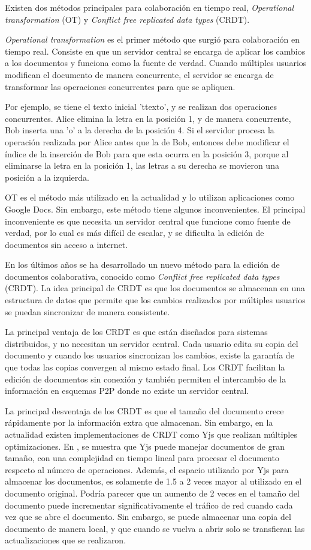 \documentclass[a4paper, oneside, final]{scrartcl}
\begin{document}
Existen dos métodos principales para colaboración en tiempo real, \textit{Operational transformation} (OT) y \textit{Conflict free replicated data types} (CRDT).

\textit{Operational transformation} es el primer método que surgió para colaboración en tiempo real. Consiste en que un servidor central se encarga de aplicar los cambios a los documentos y funciona como la fuente de verdad. Cuando múltiples usuarios modifican el documento de manera concurrente, el servidor se encarga de transformar las operaciones concurrentes para que se apliquen. 

Por ejemplo, se tiene el texto inicial 'ttexto', y se realizan dos operaciones concurrentes. Alice elimina la letra en la posición 1, y de manera concurrente, Bob inserta una 'o' a la derecha de la posición 4. Si el servidor procesa la operación realizada por Alice antes que la de Bob, entonces debe modificar el índice de la inserción de Bob para que esta ocurra en la posición 3, porque al eliminarse la letra en la posición 1, las letras a su derecha se movieron una posición a la izquierda.

OT es el método más utilizado en la actualidad y lo utilizan aplicaciones como Google Docs. Sin embargo, este método tiene algunos inconvenientes. El principal inconveniente es que necesita un servidor central que funcione como fuente de verdad, por lo cual es más difícil de escalar, y se dificulta la edición de documentos sin acceso a internet.

En los últimos años se ha desarrollado un nuevo método para la edición de documentos colaborativa, conocido como \textit{Conflict free replicated data types} (CRDT). La idea principal de CRDT es que los documentos se almacenan en una estructura de datos que permite que los cambios realizados por múltiples usuarios se puedan sincronizar de manera consistente. 

La principal ventaja de los CRDT es que están diseñados para sistemas distribuidos, y no necesitan un servidor central. Cada usuario edita su copia del documento y cuando los usuarios sincronizan los cambios, existe la garantía de que todas las copias convergen al mismo estado final. Los CRDT facilitan la edición de documentos sin conexión y también permiten el intercambio de la información en esquemas P2P donde no existe un servidor central. 

La principal desventaja de los CRDT es que el tamaño del documento crece rápidamente por la información extra que almacenan. Sin embargo, en la actualidad existen implementaciones de CRDT como Yjs \cite{yjs-no-date} que realizan múltiples optimizaciones. En \cite{jahns-2020}, se muestra que Yjs puede manejar documentos de gran tamaño, con una complejidad en tiempo lineal para procesar el documento respecto al número de operaciones. Además, el espacio utilizado por Yjs para almacenar los documentos, es solamente de 1.5 a 2 veces mayor al utilizado en el documento original. Podría parecer que un aumento de 2 veces en el tamaño del documento puede incrementar significativamente el tráfico de red cuando cada vez que se abre el documento. Sin embargo, se puede almacenar una copia del documento de manera local, y que cuando se vuelva a abrir solo se transfieran las actualizaciones que se realizaron.
\end{document}
